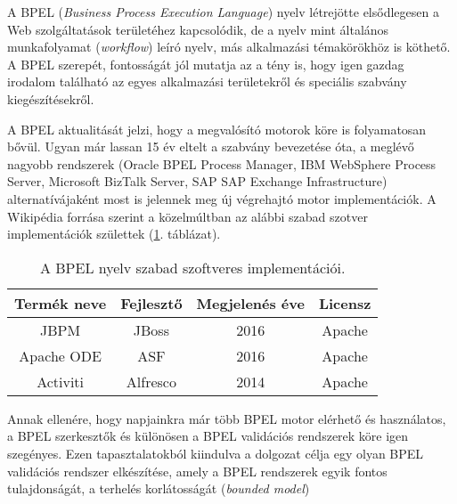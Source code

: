 

A BPEL (\textit{Business Process Execution Language}) nyelv létrejötte elsődlegesen a Web szolgáltatások területéhez kapcsolódik, de a nyelv mint általános munkafolyamat (\textit{workflow}) leíró nyelv, más alkalmazási témakörökhöz is köthető. A BPEL szerepét, fontosságát jól mutatja az a tény is, hogy igen gazdag irodalom található az egyes alkalmazási területekről és speciális szabvány kiegészítésekről.

A  BPEL aktualitását jelzi, hogy a megvalósító motorok köre is folyamatosan bővül. Ugyan már lassan 15 év eltelt a szabvány bevezetése óta, a meglévő nagyobb rendszerek (Oracle BPEL Process Manager, IBM WebSphere Process Server, Microsoft BizTalk Server, SAP SAP Exchange Infrastructure) alternatívájaként  most is jelennek meg új végrehajtó motor implementációk. A Wikipédia forrása szerint \cite{wikiBpelList} a közelmúltban az alábbi szabad szotver implementációk születtek (\ref{tab:bpel_softwares}. táblázat).

\begin{table}[h!]
\centering
\caption{A BPEL nyelv szabad szoftveres implementációi.}
\label{tab:bpel_softwares}
\begin{tabular}{|c|c|c|c|}
\hline
\textbf{Termék neve} & \textbf{Fejlesztő} & \textbf{Megjelenés éve} & \textbf{Licensz}\\
\hline
JBPM & JBoss & 2016 & Apache\\
Apache ODE & ASF & 2016 & Apache\\
Activiti & Alfresco & 2014 & Apache\\
\hline
\end{tabular}
\end{table}

Annak ellenére, hogy napjainkra már több BPEL motor elérhető és használatos, a BPEL szerkesztők és különösen a BPEL validációs rendszerek köre igen szegényes. Ezen tapasztalatokból kiindulva a dolgozat célja egy olyan BPEL validációs rendszer elkészítése, amely a BPEL rendszerek egyik fontos tulajdonságát, a terhelés korlátosságát (\textit{bounded model})

